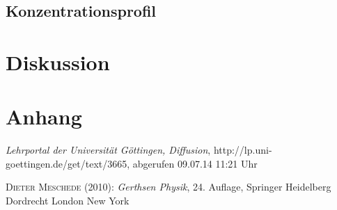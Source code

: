 \documentclass[12pt,a4paper,titlepage,headinclude,bibtotoc]{scrartcl}
\begin{document}
\subsection{Konzentrationsprofil}


\section{Diskussion}
\label{sec:diskussion}

\section{Anhang}

\begin{thebibliography}{100}

	\emph{Lehrportal der Universität Göttingen, Diffusion},
  http://lp.uni-goettingen.de/get/text/3665, abgerufen 09.07.14 11:21 Uhr

	\textsc{Dieter Meschede} (2010): \emph{Gerthsen Physik}, 24. Auflage, Springer Heidelberg
Dordrecht London New York

\end{thebibliography}
\end{document}
